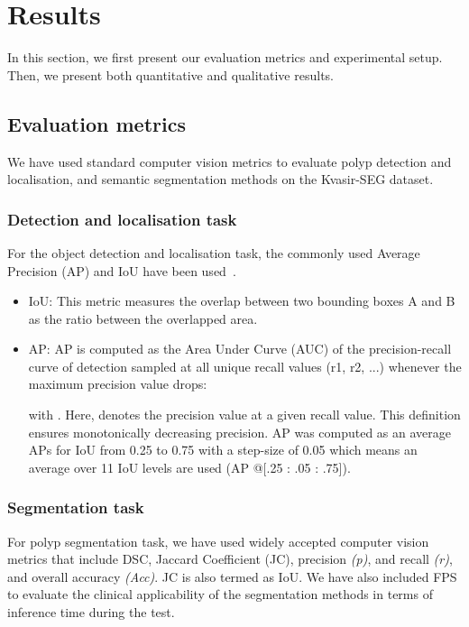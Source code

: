 \documentclass[journal]{IEEEtran}
\begin{document}
\section{Results}
\label{sec:results}

In this section,  we first present our evaluation metrics and experimental setup. Then, we present both quantitative and qualitative results.
\subsection{Evaluation metrics}    

We have used standard computer vision metrics to evaluate polyp detection and localisation, and semantic segmentation methods on the Kvasir-SEG dataset. 

\subsubsection{Detection and localisation task}
For the object detection and localisation task, the commonly used Average Precision (AP) and \ac{IoU}  have been used~\cite{everingham2015pascal,lin2014microsoft}. 

\begin{itemize}
\item {IoU}: This metric measures the overlap between two bounding boxes A and B as the ratio between the overlapped area.

\item {AP}: AP is computed as the Area Under Curve (AUC) of the precision-recall curve of detection sampled at all unique recall values (r1, r2, ...) whenever the maximum precision value drops:

with . Here,  denotes the precision value at a given recall value. This definition ensures monotonically decreasing precision. AP was computed as an average APs for IoU from 0.25 to 0.75 with a step-size of 0.05 which means an average over 11 IoU levels are used (AP @[.25 : .05 : .75]). 
\end{itemize}

\subsubsection{Segmentation task}
For polyp segmentation task, we have used widely accepted computer vision metrics that include \ac{DSC}, {Jaccard Coefficient} (JC), precision \textit{(p)}, and recall \textit{(r)}, and overall accuracy \textit{(Acc)}. JC is also termed as \ac{IoU}. We have also included \ac{FPS} to evaluate the clinical applicability of the segmentation methods in terms of inference time during the test. 
\end{document}
